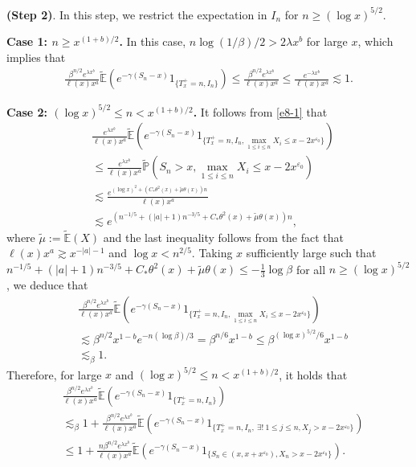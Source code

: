\documentclass[11pt]{article}
\numberwithin{equation}{section}
\begin{document}
\noindent
{\bf(Step 2)}.  In this step, we restrict the expectation in $I_n$ for   $n\geq (\log x)^{5/2}$.

\noindent
{\bf Case 1: $n\geq x^{(1+b)/2}$.}
In this case,  $n\log (1/\beta) /2 >2\lambda x^b$ for large $x$, which implies that
\begin{align}\label{e20-1}
	\frac{ \beta^{n/2} e^{\lambda x^b}}{\ell(x) x^a }\widetilde{\mathbb{E}}\left(e^{-\gamma (S_n-x)}1_{\{T_x^+=n, I_n\}}\right) \leq 	\frac{ \beta^{n/2} e^{\lambda x^b}}{\ell(x) x^a } \leq \frac{ e^{-\lambda x^b}}{\ell(x) x^a } \lesssim 1. 
\end{align}

\noindent
{\bf Case 2: $(\log x)^{5/2} \leq n < x^{(1+b)/2}$.} It follows from \eqref{e8-1} that 
\begin{align}
		& \frac{e^{\lambda x^b} }{\ell(x) x^a }   \widetilde{\mathbb{E}}\left(e^{-\gamma (S_n-x)}1_{\{T_x^+=n, I_n,\max_{1\leq i\leq n} X_i \leq x-2x^{\varepsilon_0}\}}\right) \nonumber\\
		&\leq \frac{e^{\lambda x^b} }{\ell(x) x^a }   \widetilde{\mathbb{P}}\left( S_n >x, \max_{1\leq i\leq n} X_i \leq x-2x^{\varepsilon_0} \right)\nonumber\\
		& \lesssim   \frac{e^{(\log x)^2+\left(C_*\theta^2(x)+\widetilde{\mu} \theta(x) \right)n} }{\ell(x) x^a }  \nonumber\\
		&\lesssim  e^{\left(n^{-1/5}+ (|a|+1)n^{-3/5}+ C_*\theta^2(x) +\widetilde{\mu} \theta(x) \right)n}  ,
\end{align}
where $\widetilde{\mu}:= \widetilde{\mathbb{E}}(X)$ and the last inequality follows from the fact that $\ell (x) x^{a}\gtrsim x^{-|a|-1}$ and $\log x < n^{2/5}$.  Taking $x$ sufficiently large such that 
$n^{-1/5}+ (|a|+1)n^{-3/5}+ C_*\theta^2(x)+\widetilde{\mu} \theta(x)\leq -\frac{1}{3}\log \beta$ for all $n\geq  (\log x)^{5/2}$,  we deduce that 
\begin{align}
		& \frac{ \beta^{n/2}e^{\lambda x^b} }{\ell(x) x^a }  \widetilde{\mathbb{E}}\left(e^{-\gamma (S_n-x)}1_{\{T_x^+=n, I_n,\max_{1\leq i\leq n} X_i \leq x-2x^{\varepsilon_0}\}}\right) \nonumber\\
		& \lesssim \beta^{n/2} x^{1-b}e^{ -n (\log \beta)/3} =\beta^{n/6}x^{1-b}  \leq \beta^{(\log x)^{5/2}/6}x^{1-b} \nonumber\\
		& \lesssim_\beta 1.
\end{align}
Therefore,  for large $x$ and $(\log x)^{5/2} \leq n < x^{(1+b)/2}$, it holds that
\begin{align}
	& \frac{ \beta^{n/2} e^{\lambda x^b}}{\ell(x) x^a }  \widetilde{\mathbb{E}}\left(e^{-\gamma (S_n-x)}1_{\{T_x^+=n, I_n\}}\right) \nonumber\\
	& \lesssim_\beta 1+  \frac{ \beta^{n/2} e^{\lambda x^b}}{\ell(x) x^a } \widetilde{\mathbb{E}}\left(e^{-\gamma (S_n-x)}1_{\{T_x^+=n, I_n, \ \exists !\ 1\leq  j\leq n, X_j >x-2x^{\varepsilon_0}\}}\right) \nonumber\\
	& \leq 1+  \frac{ n \beta^{n/2} e^{\lambda x^b}}{\ell(x) x^a }\widetilde{\mathbb{E}}\left(e^{-\gamma (S_n-x)}1_{\{S_n\in (x, x+x^{\varepsilon_0}), X_n >x-2x^{\varepsilon_0}  \}}\right).
\end{align}
\end{document}
